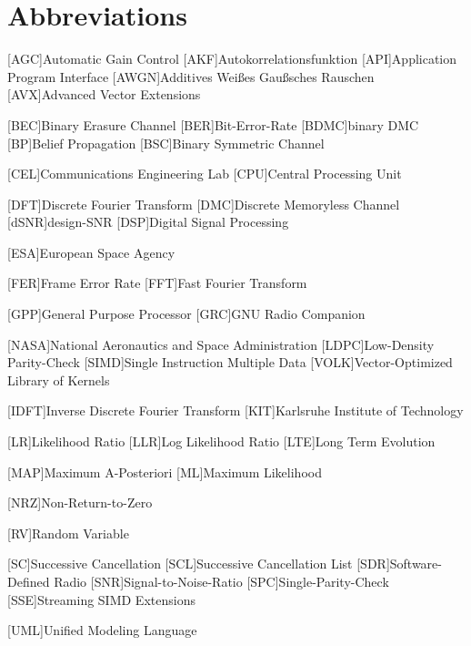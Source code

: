 \chapter{Abbreviations}
\begin{acronym}[TROLL]
  [AGC]{Automatic Gain Control}
  [AKF]{Autokorrelationsfunktion}
  [API]{Application Program Interface}
  [AWGN]{Additives Weißes Gaußsches Rauschen}
  [AVX]{Advanced Vector Extensions}
  
  [BEC]{Binary Erasure Channel}
  [BER]{Bit-Error-Rate}
  [BDMC]{binary \acs{DMC}}
  [BP]{Belief Propagation}
  [BSC]{Binary Symmetric Channel}
  
  [CEL]{Communications Engineering Lab}
  [CPU]{Central Processing Unit}

  [DFT]{Discrete Fourier Transform}
  [DMC]{Discrete Memoryless Channel}
  [dSNR]{design-\ac{SNR}}
  [DSP]{Digital Signal Processing}
 
  [ESA]{European Space Agency}

  [FER]{Frame Error Rate}
  [FFT]{Fast Fourier Transform}
  
  [GPP]{General Purpose Processor}
  [GRC]{GNU Radio Companion}
  
  [NASA]{National Aeronautics and Space Administration}
  [LDPC]{Low-Density Parity-Check}
  [SIMD]{Single Instruction Multiple Data}
  [VOLK]{Vector-Optimized Library of Kernels}

  [IDFT]{Inverse Discrete Fourier Transform}
  [KIT]{Karlsruhe Institute of Technology}

  [LR]{Likelihood Ratio}
  [LLR]{Log Likelihood Ratio}
  [LTE]{Long Term Evolution}
 
  [MAP]{Maximum A-Posteriori}
  [ML]{Maximum Likelihood}
 
  [NRZ]{Non-Return-to-Zero}
 
  [RV]{Random Variable}
 
  [SC]{Successive Cancellation}
  [SCL]{Successive Cancellation List}
  [SDR]{Software-Defined Radio}
  [SNR]{Signal-to-Noise-Ratio}
  [SPC]{Single-Parity-Check}
  [SSE]{Streaming SIMD Extensions}

 [UML]{Unified Modeling Language}
 
\end{acronym}
